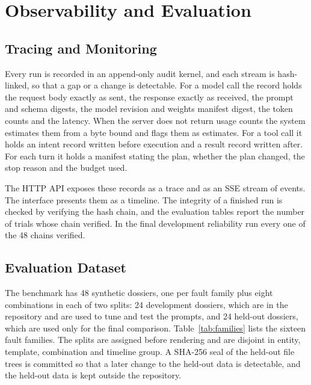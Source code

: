 \chapter{Observability and Evaluation}
\label{ch:eval}

\section{Tracing and Monitoring}
Every run is recorded in an append-only audit kernel, and each stream is hash-linked, so that a gap or a
change is detectable. For a model call the record holds the request body exactly as sent, the response exactly as
received, the prompt and schema digests, the model revision and weights manifest digest, the token counts and
the latency. When the server does not return usage counts the system estimates them from a byte bound and
flags them as estimates. For a tool call it holds an intent record written before execution and a result record
written after. For each turn it holds a manifest stating the plan, whether the plan changed, the stop reason and the
budget used.

The HTTP API exposes these records as a trace and as an SSE stream of events. The interface presents them as a
timeline. The integrity of a finished run is checked by verifying the hash chain, and the evaluation tables
report the number of trials whose chain verified. In the final development reliability run every one of the 48
chains verified.

\section{Evaluation Dataset}
\label{sec:dataset}
The benchmark  has 48 synthetic dossiers, one per fault family plus eight combinations in each
of two splits: 24 development dossiers, which are in the repository and are used to tune and test the
prompts, and 24 held-out dossiers, which are used only for the final comparison. Table~\ref{tab:families}
lists the sixteen fault families. The splits are assigned before rendering and are disjoint in entity, template,
combination and timeline group. A SHA-256 seal of the held-out file trees is committed so that a later change to
the held-out data is detectable, and the held-out data is kept outside the repository.

